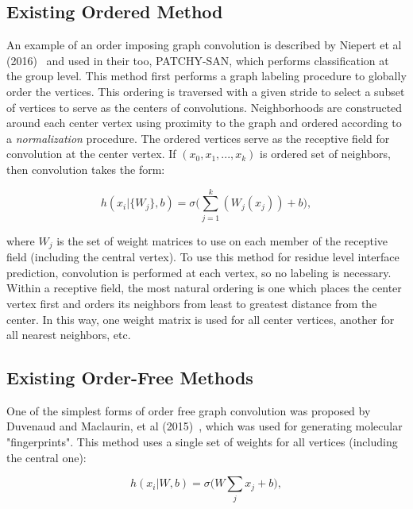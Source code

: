 \subsection{Existing Ordered Method}

An example of an order imposing graph convolution is described by Niepert et al (2016)~\cite{niepert2016} and used in their too, PATCHY-SAN, which performs classification at the group level.
This method first performs a graph labeling procedure to globally order the vertices.
This ordering is traversed with a given stride to select a subset of vertices to serve as the centers of convolutions.
Neighborhoods are constructed around each center vertex using proximity to the graph and ordered according to a \emph{normalization} procedure.
The ordered vertices serve as the receptive field for convolution at the center vertex.
If $(x_0, x_1, ... , x_k)$ is ordered set of neighbors, then convolution takes the form:

\begin{equation}
h(x_i | \{ W_{j} \}, b)= \sigma \bigg( \sum_{j=1}^{k}(W_{j} (x_j)) + b \bigg),
\label{eq:patchysan}
\end{equation}

\noindent
where ${W_j}$ is the set of weight matrices to use on each member of the receptive field (including the central vertex).
To use this method for residue level interface prediction, convolution is performed at each vertex, so no labeling is necessary. 
Within a receptive field, the most natural ordering is one which places the center vertex first and orders its neighbors from least to greatest distance from the center. 
In this way, one weight matrix is used for all center vertices, another for all nearest neighbors, etc.


\subsection{Existing Order-Free Methods}
One of the simplest forms of order free graph convolution was proposed by Duvenaud and Maclaurin, et al (2015)~\cite{duvenaud2015}, which was used for generating molecular "fingerprints".
This method uses a single set of weights for all vertices (including the central one):

\begin{equation}
h(x_i | W, b)= \sigma \bigg( W \sum_{j}x_j + b\bigg),
\label{eq:fingerprint}
\end{equation}

